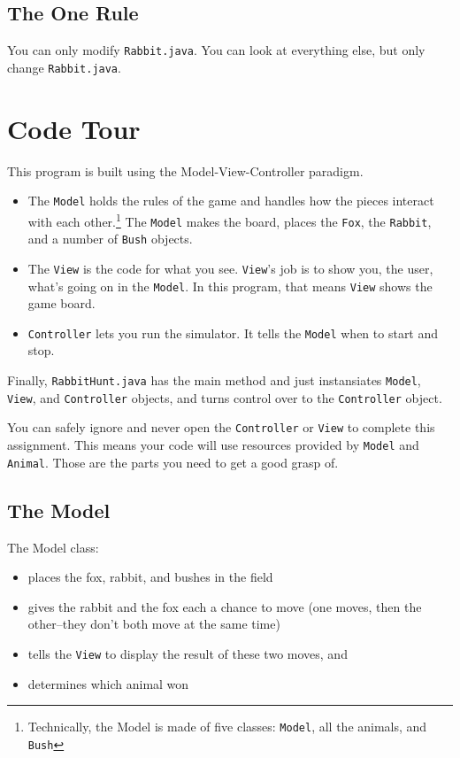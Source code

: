 \documentclass[10pt,letterpaper]{article}
\begin{document}
	\subsection{The One Rule}
	You can only modify \texttt{Rabbit.java}.  
	You can look at everything else, but only change \texttt{Rabbit.java}.
	
	\newpage
	\section{Code Tour}
	This program is built using the Model-View-Controller paradigm.
	
	\begin{itemize}
		\item The \texttt{Model} holds the rules of the game and handles how the pieces interact with each other.\footnote{Technically, the Model is made of five classes: \texttt{Model}, all the animals, and \texttt{Bush}}
		The \texttt{Model} makes the board, places the \texttt{Fox}, the \texttt{Rabbit}, and a number of \texttt{Bush} objects.
		\item The \texttt{View} is the code for what you see.  \texttt{View}'s job is to show you, the user, what's going on in the \texttt{Model}.  
		In this program, that means \texttt{View} shows the game board.
		\item \texttt{Controller} lets you run the simulator.  It tells the \texttt{Model} when to start and stop.
	\end{itemize}
	
	Finally, \texttt{RabbitHunt.java} has the main method and just instansiates \texttt{Model}, \texttt{View}, and \texttt{Controller} objects, and turns control over to the \texttt{Controller} object.
	
	
	You can safely ignore and never open the \texttt{Controller} or \texttt{View} to complete this assignment.
	This means your code will use resources provided by \texttt{Model} and \texttt{Animal}.
	Those are the parts you need to get a good grasp of.
	
	\subsection{The Model}
	
	
	
	The Model class:
	\begin{itemize}
		\item places the fox, rabbit, and bushes in the field
			
		\item gives the rabbit and the fox each a chance to move (one moves, then the other--they don't both move at the same time)
		\item tells the \texttt{View} to display the result of these two moves, and
		\item determines which animal won
	\end{itemize}
\end{document}
